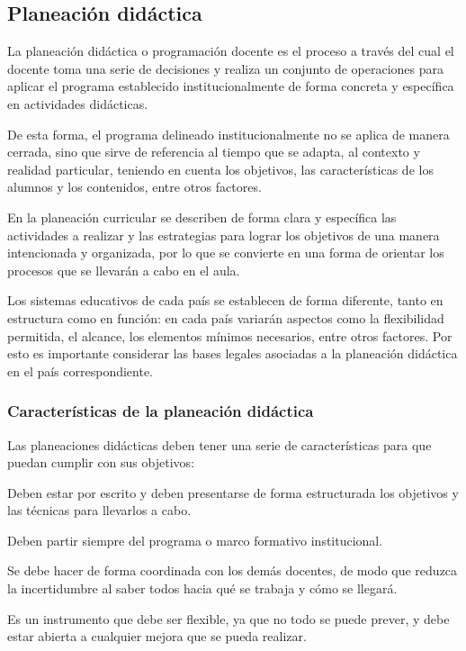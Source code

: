 
\subsection{Planeación didáctica}

La planeación didáctica o programación docente es el proceso a través del cual el docente toma una serie de decisiones y realiza un conjunto de operaciones para aplicar el programa establecido institucionalmente de forma concreta y específica en actividades didácticas.

De esta forma, el programa delineado institucionalmente no se aplica de manera cerrada, sino que sirve de referencia al tiempo que se adapta, al contexto y realidad particular, teniendo en cuenta los objetivos, las características de los alumnos y los contenidos, entre otros factores.

En la planeación curricular se describen de forma clara y específica las actividades a realizar y las estrategias para lograr los objetivos de una manera intencionada y organizada, por lo que se convierte en una forma de orientar los procesos que se llevarán a cabo en el aula.

Los sistemas educativos de cada país se establecen de forma diferente, tanto en estructura como en función: en cada país variarán aspectos como la flexibilidad permitida, el alcance, los elementos mínimos necesarios, entre otros factores. Por esto es importante considerar las bases legales asociadas a la planeación didáctica en el país correspondiente. \cite{cajal2020}

\subsubsection{Características de la planeación didáctica}

Las planeaciones didácticas deben tener una serie de características para que puedan cumplir con sus objetivos:

Deben estar por escrito y deben presentarse de forma estructurada los objetivos y las técnicas para llevarlos a cabo.

Deben partir siempre del programa o marco formativo institucional.

Se debe hacer de forma coordinada con los demás docentes, de modo que reduzca la incertidumbre al saber todos hacia qué se trabaja y cómo se llegará.

Es un instrumento que debe ser flexible, ya que no todo se puede prever, y debe estar abierta a cualquier mejora que se pueda realizar.


